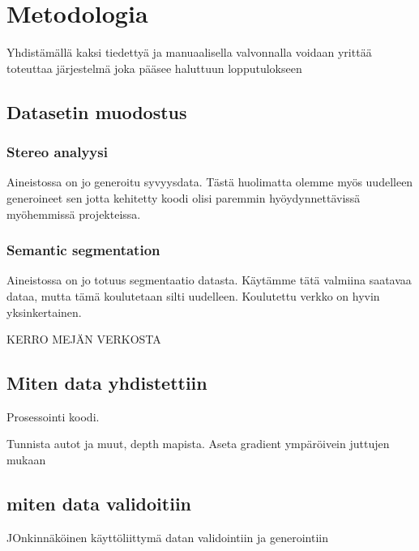 \chapter{Metodologia}%
\label{ch:metodologia}

Yhdistämällä kaksi tiedettyä ja manuaalisella valvonnalla voidaan yrittää toteuttaa järjestelmä joka pääsee haluttuun lopputulokseen


\section{Datasetin muodostus}

\subsection{Stereo analyysi}

Aineistossa on jo generoitu syvyysdata. Tästä huolimatta olemme myös uudelleen generoineet sen jotta kehitetty koodi olisi paremmin hyöydynnettävissä myöhemmissä projekteissa.

\subsection{Semantic segmentation}

Aineistossa on jo totuus segmentaatio datasta. Käytämme tätä valmiina saatavaa dataa, mutta tämä koulutetaan silti uudelleen. Koulutettu verkko on hyvin yksinkertainen.

KERRO MEJÄN VERKOSTA

\section{Miten data yhdistettiin}

Prosessointi koodi. 

Tunnista autot ja muut, depth mapista. 
Aseta gradient ympäröivein juttujen mukaan


\section{miten data validoitiin}

JOnkinnäköinen käyttöliittymä datan validointiin ja generointiin
